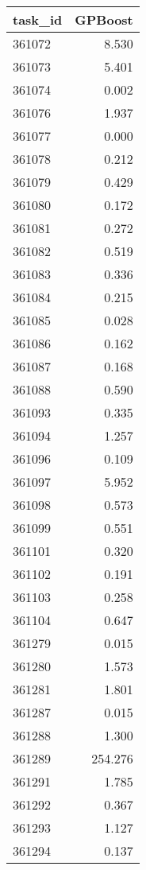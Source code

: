 \begin{tabular}{lr}
\toprule
task\_id & GPBoost \\
\midrule
361072 & 8.530 \\
361073 & 5.401 \\
361074 & 0.002 \\
361076 & 1.937 \\
361077 & 0.000 \\
361078 & 0.212 \\
361079 & 0.429 \\
361080 & 0.172 \\
361081 & 0.272 \\
361082 & 0.519 \\
361083 & 0.336 \\
361084 & 0.215 \\
361085 & 0.028 \\
361086 & 0.162 \\
361087 & 0.168 \\
361088 & 0.590 \\
361093 & 0.335 \\
361094 & 1.257 \\
361096 & 0.109 \\
361097 & 5.952 \\
361098 & 0.573 \\
361099 & 0.551 \\
361101 & 0.320 \\
361102 & 0.191 \\
361103 & 0.258 \\
361104 & 0.647 \\
361279 & 0.015 \\
361280 & 1.573 \\
361281 & 1.801 \\
361287 & 0.015 \\
361288 & 1.300 \\
361289 & 254.276 \\
361291 & 1.785 \\
361292 & 0.367 \\
361293 & 1.127 \\
361294 & 0.137 \\
\bottomrule
\end{tabular}
